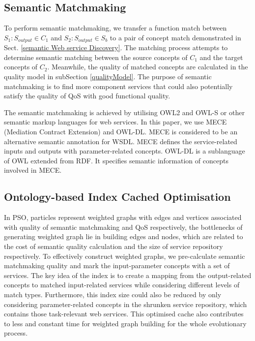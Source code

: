\documentclass{IEEEtran}
\begin{document}
\subsection{Semantic Matchmaking} \label{semantic_matchmaking}
To perform semantic matchmaking, we transfer a function match between $S_{1}: S_{output} \in C_{1}$ and $S_{2}:S_{output} \in S_{b}$ to a pair of concept match demonstrated in Sect. \ref{semantic Web service Discovery}. The matching process attempts to determine semantic matching between the source concepts of $C_{1}$ and the target concepts of $C_{2}$. Meanwhile, the quality of matched concepts are calculated in the quality model in subSection \ref{qualityModel}. The purpose of semantic matchmaking is to find more component services that could also potentially satisfy the quality of QoS with good functional quality.

The semantic matchmaking is achieved by utilising OWL2 and OWL-S or other semantic markup languages for web services. In this paper, we use MECE (Mediation Contract Extension) \cite{bleul2008self} and OWL-DL. MECE is considered to be an alternative semantic annotation for WSDL. MECE defines the service-related inputs and outputs with parameter-related concepts. OWL-DL is a sublanguage of OWL extended from RDF. It specifies semantic information of concepts involved in MECE. 

\subsection{Ontology-based Index Cached Optimisation}\label{indexCache}
In PSO, particles represent weighted graphs with edges and vertices associated with quality of semantic matchmaking and QoS respectively, the bottlenecks of generating weighted graph lie in building edges and nodes, which are related to the cost of semantic quality calculation and the size of service repository respectively. To effectively construct weighted graphs, we pre-calculate semantic matchmaking quality and mark the input-parameter concepts with a set of services. The key idea of the index is to create a mapping from the output-related concepts to matched input-related services while considering different levels of match types. Furthermore, this index size could also be reduced by only considering parameter-related concepts in the shrunken service repository, which contains  those task-relevant web services. This optimised cache also contributes to less and constant time for weighted graph building for the whole evolutionary process.
\end{document}

